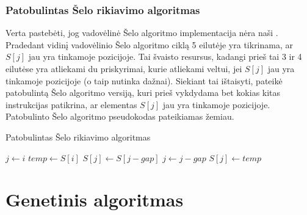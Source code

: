 \documentclass{VUMIFInfKursinis}
\begin{document}
\subsubsection{Patobulintas Šelo rikiavimo algoritmas}

Verta pastebėti, jog vadovėlinė Šelo algoritmo implementacija nėra naši \cite{Radavičius_Baranauskas_2013}.
Pradedant vidinį vadovėlinio Šelo algoritmo ciklą 5 eilutėje yra tikrinama, ar $S[j]$ jau yra tinkamoje pozicijoje.
Tai švaisto resursus, kadangi prieš tai 3 ir 4 eilutėse yra atliekami du priskyrimai,
kurie atliekami veltui, jei $S[j]$ jau yra tinkamoje pozicijoje (o taip nutinka dažnai).
Siekiant tai ištaisyti, \cite{Radavičius_Baranauskas_2013} pateikė patobulintą Šelo algoritmo versiją, kuri prieš vykdydama
bet kokias kitas instrukcijas patikrina, ar elementas $S[j]$ jau yra tinkamoje pozicijoje.
Patobulinto Šelo algoritmo pseudokodas pateikiamas žemiau.

\begin{algorithm}[H]
  \caption{Patobulintas Šelo rikiavimo algoritmas}\label{alg:iss}
  \begin{algorithmic}[1]
        \State $j\gets i$
        \State $temp\gets S[i]$
        \Repeat
          \State $S[j]\gets S[j - gap]$
          \State $j\gets j-gap$
        \State $S[j]\gets temp$
      \EndIf
    \EndFor
  \EndFor
  \end{algorithmic}
\end{algorithm}

\section{Genetinis algoritmas}
\end{document}
